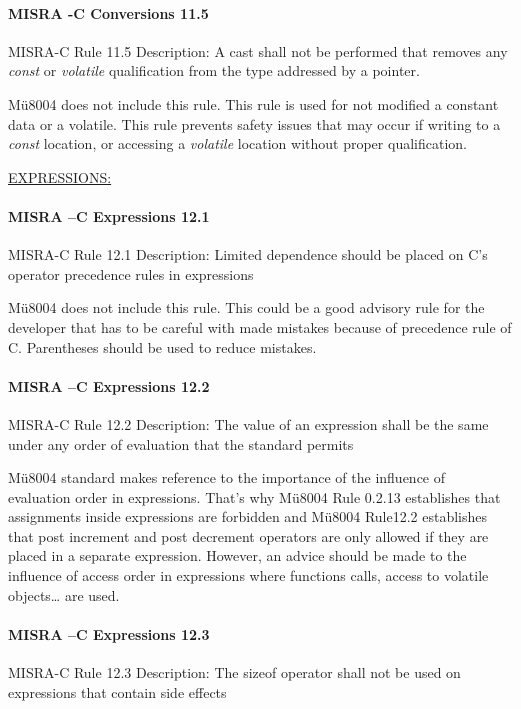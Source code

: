 \paragraph{MISRA -C Conversions 11.5}
MISRA-C Rule 11.5 Description: A cast shall not be performed that removes any {\it const} or {\it volatile} qualification from the type addressed by a pointer.

Mü8004 does not include this rule. This rule is used for not modified a constant data or a volatile. This rule prevents safety issues that may occur if 
writing to a {\it const} location, or accessing a {\it volatile} location
without proper qualification.


\begin{center}
\textsc{\underline{EXPRESSIONS:}}
\end{center}

\paragraph{MISRA –C Expressions 12.1}
MISRA-C Rule 12.1 Description: Limited dependence should be placed on C’s operator precedence rules in expressions

Mü8004 does not include this rule. This could be a good advisory rule for the developer that has to be careful with made mistakes because of precedence rule of C. Parentheses should be used to reduce mistakes.

\paragraph{MISRA –C Expressions 12.2}
MISRA-C Rule 12.2 Description: The value of an expression shall be the same under any order of evaluation that the standard permits

Mü8004 standard makes reference to the importance of the influence of evaluation order in expressions.  That’s why Mü8004 Rule 0.2.13 establishes that assignments inside expressions are forbidden and Mü8004 Rule12.2 establishes that post increment and post decrement operators are only allowed if they are placed in a separate expression. However, an advice should be made to the influence of access order in expressions where functions calls, access to volatile objects… are used.

\paragraph{MISRA –C Expressions 12.3}
MISRA-C Rule 12.3 Description: The sizeof operator shall not be used on expressions that contain side effects

